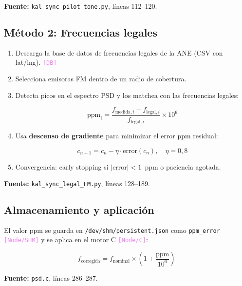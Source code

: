\documentclass[11pt,a4paper]{article}
\newcommand{\where}[1]{\textcolor{violet}{\texttt{[#1]}}}
\begin{document}
\textbf{Fuente:} \texttt{kal\_sync\_pilot\_tone.py}, líneas 112--120.

\subsection{Método 2: Frecuencias legales}

\begin{enumerate}
\item Descarga la base de datos de frecuencias legales de la ANE (CSV con lat/lng). \where{DB}
\item Selecciona emisoras FM dentro de un radio de cobertura.
\item Detecta picos en el espectro PSD y los matchea con las frecuencias legales:

\begin{equation}
\text{ppm}_i = \frac{f_{\text{medida},i} - f_{\text{legal},i}}{f_{\text{legal},i}} \times 10^6
\label{eq:ppm_legal}
\end{equation}

\item Usa \textbf{descenso de gradiente} para minimizar el error ppm residual:

\begin{equation}
c_{n+1} = c_n - \eta \cdot \text{error}(c_n), \quad \eta = 0{,}8
\label{eq:gradient}
\end{equation}

\item Convergencia: early stopping si $|\text{error}| < 1$~ppm o paciencia agotada.
\end{enumerate}

\textbf{Fuente:} \texttt{kal\_sync\_legal\_FM.py}, líneas 128--189.

\subsection{Almacenamiento y aplicación}

El valor ppm se guarda en \texttt{/dev/shm/persistent.json} como \texttt{ppm\_error} \where{Node/SHM} y se aplica en el motor C \where{Node/C}:

\begin{equation}
f_{\text{corregida}} = f_{\text{nominal}} \times \left(1 + \frac{\text{ppm}}{10^6}\right)
\label{eq:ppm_apply}
\end{equation}

\textbf{Fuente:} \texttt{psd.c}, líneas 286--287.

\end{document}
